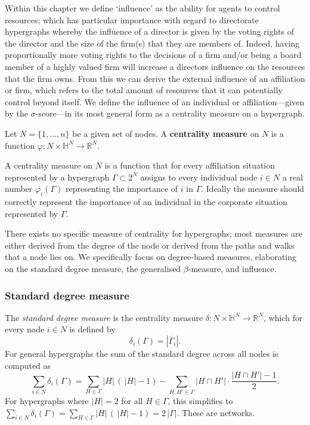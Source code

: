 Within this chapter we define `influence' as the ability for agents to control resources; which has particular importance with regard to directorate hypergraphs whereby the influence of a director is given by the voting rights of the director and the size of the firm(s) that they are members of. Indeed, having proportionally more voting rights to the decisions of a firm and/or being a board member of a highly valued firm will increase a directors influence on the resources that the firm owns. From this we can derive the external influence of an affiliation or firm, which refers to the total amount of resources that it can potentially control beyond itself. We define the influence of an individual or affiliation---given by the $\sigma$-score---in its most general form as a centrality measure on a hypergraph.
\begin{definition}
Let $N = \{ 1, \ldots ,n \}$ be a given set of nodes. A \textbf{centrality measure} on $N$ is a function $\varphi \colon N \times \mathbb{H}^N \to \mathbb{R}^N$.
\end{definition}
A centrality measure on $N$ is a function that for every affiliation situation represented by a hypergraph $\Gamma \subset 2^N$ assigns to every individual node $i \in N$ a real number $\varphi_i ( \Gamma )$ representing the importance of $i$ in $\Gamma$. Ideally the measure should correctly represent the importance of an individual in the corporate situation represented by $\Gamma$.

There exists no specific measure of centrality for hypergraphs; most measures are either derived from the degree of the node or derived from the paths and walks that a node lies on. We specifically focus on degree-based measures, elaborating on the standard degree measure, the generalised $\beta$-measure, and influence.

\subsubsection*{Standard degree measure}

The \emph{standard degree measure} is the centrality measure $\delta \colon N \times \mathbb{H}^N \to \mathbb{R}^N$, which for every node $i \in N$ is defined by
\begin{equation}
\delta_i (\Gamma ) = \left| \overline{\Gamma}_i \right| .
\end{equation}
For general hypergraphs the sum of the standard degree across all nodes is computed as
\begin{equation}
\sum_{i \in N} \delta_i (\Gamma ) = \sum_{H \in \Gamma} | H | \, ( \, | H | - 1) - \sum_{H,H' \in \Gamma} | H \cap H' | \cdot \frac{| H \cap H' | - 1}{2} .
\end{equation}
For hypergraphs where $| H | = 2$ for all $H \in \Gamma$, this simplifies to $\sum_{i \in N} \delta_i (\Gamma ) = \sum_{H \in \Gamma} | H | \, ( \, | H | - 1) = 2 \, | \Gamma |$. These are networks.

